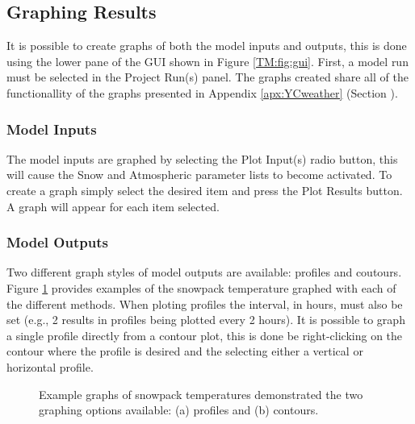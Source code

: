 \subsection{Graphing Results}
It is possible to create graphs of both the model inputs and outputs, this is done using the lower pane of the GUI shown in Figure \ref{TM:fig:gui}.  First, a model run must be selected in the Project Run(s) panel.  The graphs created share all of the functionallity of the graphs presented in Appendix \ref{apx:YCweather} (Section ).

\subsubsection{Model Inputs}
The model inputs are graphed by selecting the Plot Input(s) radio button, this will cause the Snow and Atmospheric parameter lists to become activated. To create a graph simply select the desired item and press the Plot Results button. A graph will appear for each item selected. 

\subsubsection{Model Outputs}
Two different graph styles of model outputs are available: profiles and coutours.  Figure \ref{TM:fig:example} provides examples of the snowpack temperature graphed with each of the different methods.  When ploting profiles the interval, in hours, must also be set (e.g., 2 results in profiles being plotted every 2 hours). It is possible to graph a single profile directly from a contour plot, this is done be right-clicking on the contour where the profile is desired and the selecting either a vertical or horizontal profile. 

\begin{figure}[ht!]\centering
{}\quad
{}\quad
\caption{Example graphs of snowpack temperatures demonstrated the two graphing options available: (a) profiles and (b) contours.}
\label{TM:fig:example}
\end{figure}


